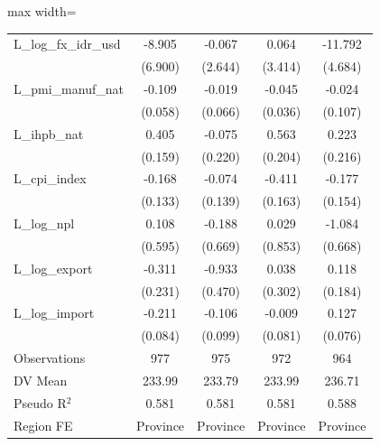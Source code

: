 \begin{table}[H]
\begin{adjustbox}{max width=\textwidth}
\begin{tabular}{l*{4}{c}}
L\_log\_fx\_idr\_usd&      -8.905         &      -0.067         &       0.064         &     -11.792\sym{*}  \\
            &     (6.900)         &     (2.644)         &     (3.414)         &     (4.684)         \\
L\_pmi\_manuf\_nat&      -0.109         &      -0.019         &      -0.045         &      -0.024         \\
            &     (0.058)         &     (0.066)         &     (0.036)         &     (0.107)         \\
L\_ihpb\_nat  &       0.405\sym{*}  &      -0.075         &       0.563\sym{**} &       0.223         \\
            &     (0.159)         &     (0.220)         &     (0.204)         &     (0.216)         \\
L\_cpi\_index &      -0.168         &      -0.074         &      -0.411\sym{*}  &      -0.177         \\
            &     (0.133)         &     (0.139)         &     (0.163)         &     (0.154)         \\
L\_log\_npl   &       0.108         &      -0.188         &       0.029         &      -1.084         \\
            &     (0.595)         &     (0.669)         &     (0.853)         &     (0.668)         \\
L\_log\_export&      -0.311         &      -0.933\sym{*}  &       0.038         &       0.118         \\
            &     (0.231)         &     (0.470)         &     (0.302)         &     (0.184)         \\
L\_log\_import&      -0.211\sym{*}  &      -0.106         &      -0.009         &       0.127         \\
            &     (0.084)         &     (0.099)         &     (0.081)         &     (0.076)         \\
\midrule
Observations&         977         &         975         &         972         &         964         \\
DV Mean     &      233.99         &      233.79         &      233.99         &      236.71         \\
Pseudo R$^2$&       0.581         &       0.581         &       0.581         &       0.588         \\
Region FE   &    Province         &    Province         &    Province         &    Province         \\

\end{tabular}
\end{adjustbox}
\end{table}
